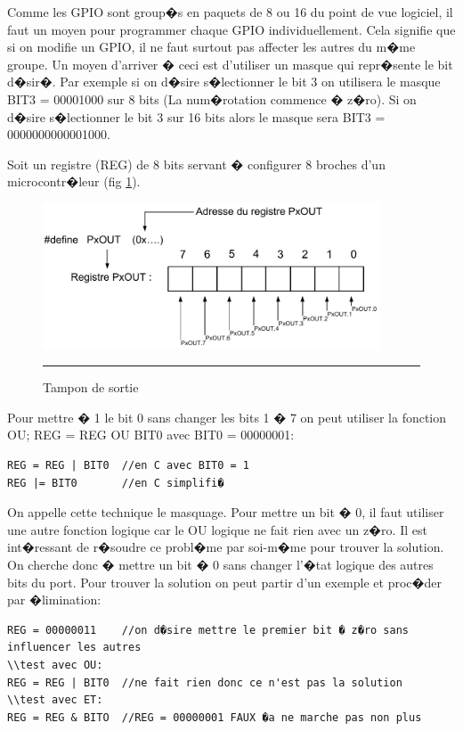 Comme les GPIO sont group�s en paquets de 8 ou 16 du point de vue logiciel, il faut un moyen pour programmer chaque GPIO individuellement. Cela signifie que si on modifie un GPIO, il ne faut surtout pas affecter les autres du m�me groupe. Un moyen d'arriver � ceci est d'utiliser un masque qui repr�sente le bit d�sir�. Par exemple si on d�sire s�lectionner le bit 3 on utilisera le masque BIT3 = 00001000 sur 8 bits (La num�rotation commence � z�ro). Si on d�sire s�lectionner le bit 3 sur 16 bits alors le masque sera BIT3 = 0000000000001000.

Soit un registre (REG) de 8 bits servant � configurer 8 broches d'un microcontr�leur (fig \ref{fig:pxout}). 

\begin{figure}[htb]
  \centering
  \includegraphics[angle=0, width=10cm]{./Figures/gpio/PxOUT.pdf}
  \rule{35em}{0.5pt}
  \caption[buff out]{Tampon de sortie}
  \label{fig:pxout}
\end{figure}

Pour mettre � 1 le bit 0 sans changer les bits 1 � 7 on peut utiliser la fonction OU; REG = REG OU BIT0 avec BIT0 = 00000001:

\lstset{style=customc}
\begin{lstlisting}
REG = REG | BIT0  //en C avec BIT0 = 1
REG |= BIT0		  //en C simplifi�
\end{lstlisting}

On appelle cette technique le masquage. Pour mettre un bit � 0, il faut utiliser une autre fonction logique car le OU logique ne fait rien avec un z�ro. Il est int�ressant de r�soudre ce probl�me par soi-m�me pour trouver la solution. On cherche donc � mettre un bit � 0 sans changer l'�tat logique des autres bits du port. Pour trouver la solution on peut partir d'un exemple et proc�der par �limination:

\lstset{style=customc}
\begin{lstlisting}
REG = 00000011    //on d�sire mettre le premier bit � z�ro sans influencer les autres
\\test avec OU:
REG = REG | BIT0  //ne fait rien donc ce n'est pas la solution
\\test avec ET:
REG = REG & BITO  //REG = 00000001 FAUX �a ne marche pas non plus
\end{lstlisting}

